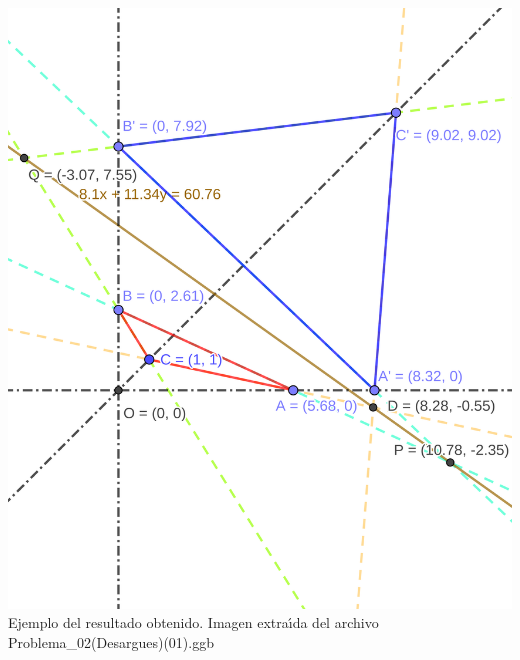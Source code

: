 \begin{solucion}
 \begin{center}
  \includegraphics{Problema_02.png}
  \\
  Ejemplo del resultado obtenido.
  Imagen extra\'{\i}da del archivo Problema\_02(Desargues)(01).ggb
 \end{center}

\end{solucion}

